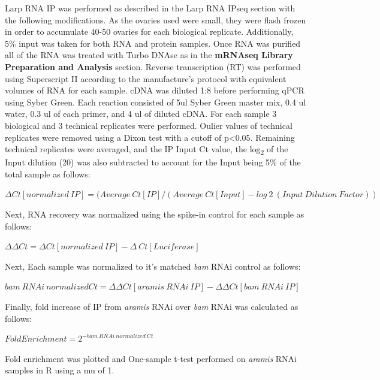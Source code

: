 \documentclass[12pt,oneside]{reedthesis}
\begin{document}
Larp RNA IP was performed as described in the Larp RNA IPseq section with the following modifications. As the ovaries used were small, they were flash frozen in order to accumulate 40-50 ovaries for each biological replicate. Additionally, 5\% input was taken for both RNA and protein samples. Once RNA was purified all of the RNA was treated with Turbo DNAse as in the \textbf{mRNAseq Library Preparation and Analysis} section. Reverse transcription (RT) was performed using Superscript II according to the manufacture's protocol with equivalent volumes of RNA for each sample. cDNA was diluted 1:8 before performing qPCR using Syber Green. Each reaction consisted of 5ul Syber Green master mix, 0.4 ul water, 0.3 ul of each primer, and 4 ul of diluted cDNA. For each sample 3 biological and 3 technical replicates were performed. Oulier values of technical replicates were removed using a Dixon test with a cutoff of p\textless0.05. Remaining technical replicates were averaged, and the IP Input Ct value, the log\textsubscript{2} of the Input dilution (20) was also subtracted to account for the Input being 5\% of the total sample as follows:

\(\Delta Ct[normalized\ IP] = (Average\ Ct[IP]/(Average\ Ct[Input] - log~2~(Input\ Dilution\ Factor))\)

Next, RNA recovery was normalized using the spike-in control for each sample as follows:

\(\Delta \Delta Ct = \Delta Ct[normalized\ IP]-\Delta\ Ct[Luciferase]\)

Next, Each sample was normalized to it's matched \emph{bam} RNAi control as follows:

\(bam\ RNAi\ normalized Ct= \Delta \Delta Ct[aramis\ RNAi\ IP] - \Delta \Delta Ct[bam\ RNAi\ IP]\)

Finally, fold increase of IP from \emph{aramis} RNAi over \emph{bam} RNAi was calculated as follows:

\(Fold Enrichment = 2^{-bam\ RNAi\ normalized\ Ct}\)

Fold enrichment was plotted and One-sample t-test performed on \emph{aramis} RNAi samples in R using a mu of 1.

\end{document}
